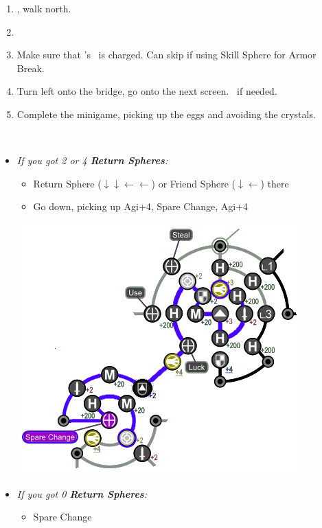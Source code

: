\begin{enumerate}[resume]
	\item \sd, walk north.
	\item \formation{\tidus}{\kimahri}{\auron}
	\item Make sure that \rikku's \od\ is charged. Can skip if using Skill Sphere for Armor Break.
	\item Turn left onto the bridge, go onto the next screen. \save\ if needed.
	\item Complete the minigame, picking up the eggs and avoiding the crystals.
\end{enumerate}
\bothvfill\winvfill\lossvfill
\ 
\colend
\begin{spheregrid}
	\begin{multicols}{2}
		\begin{itemize}
			\item \textit{If you got 2 or 4 \textbf{Return Spheres}:}
			      \begin{itemize}
				      \yunaf Attribute Sphere \rikku's +3 Agi (hold L)
				      \item Return Sphere ($\downarrow \downarrow \leftarrow \leftarrow$) or Friend Sphere ($\downarrow \leftarrow$) there
				      \item Go down, picking up Agi+4, Spare Change, Agi+4
			      \end{itemize}
			      \includegraphics[width=.8\columnwidth]{graphics/4_Return_final_grid}
			\item \textit{If you got 0 \textbf{Return Spheres}:}
			      \begin{itemize}
				      \item Spare Change

\end{itemize}
\end{itemize}
\end{multicols}
\end{spheregrid}
